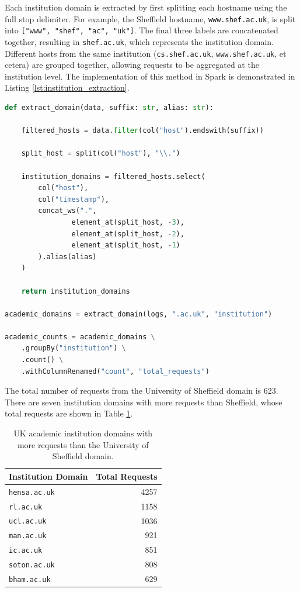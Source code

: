 \documentclass[12pt, a4paper]{article}
\begin{document}
Each institution domain is extracted by first splitting each hostname using the full stop delimiter.
For example, the Sheffield hostname, \texttt{www.shef.ac.uk}, is split into \texttt{["www", "shef", "ac", "uk"]}.
The final three labels are concatenated together, resulting in \texttt{shef.ac.uk}, which represents the institution domain.
Different hosts from the same institution (\texttt{cs.shef.ac.uk}, \texttt{www.shef.ac.uk}, et cetera) are grouped together, allowing requests to be aggregated at the institution level.
The implementation of this method in Spark is demonstrated in Listing \ref{lst:institution_extraction}.
\begin{lstlisting}[language=Python,
                   caption={Institution domain extraction and aggregation applied to UK academic hosts. The \texttt{extract\_domain} function can be applied to other hostname suffixes.},
                   label={lst:institution_extraction}]
def extract_domain(data, suffix: str, alias: str):

    filtered_hosts = data.filter(col("host").endswith(suffix))

    split_host = split(col("host"), "\\.")

    institution_domains = filtered_hosts.select(
        col("host"),
        col("timestamp"),
        concat_ws(".",
                element_at(split_host, -3),
                element_at(split_host, -2),
                element_at(split_host, -1)
        ).alias(alias)
    )

    return institution_domains

academic_domains = extract_domain(logs, ".ac.uk", "institution")

academic_counts = academic_domains \
    .groupBy("institution") \
    .count() \
    .withColumnRenamed("count", "total_requests")
\end{lstlisting}

The total number of requests from the University of Sheffield domain is 623.
There are seven institution domains with more requests than Sheffield, whose total requests are shown in Table \ref{tab:2}.
\begin{table}[htbp]
    \caption{UK academic institution domains with more requests than the University of Sheffield domain.}
    \label{tab:2}
    \centering
    \begin{tabular}{lr}
        Institution Domain & Total Requests \\
        \midrule
        \texttt{hensa.ac.uk} & 4257 \\
        \texttt{rl.ac.uk} & 1158 \\
        \texttt{ucl.ac.uk} & 1036 \\
        \texttt{man.ac.uk} & 921 \\
        \texttt{ic.ac.uk} & 851 \\
        \texttt{soton.ac.uk} & 808 \\
        \texttt{bham.ac.uk} & 629
    \end{tabular}
\end{table}
\end{document}
